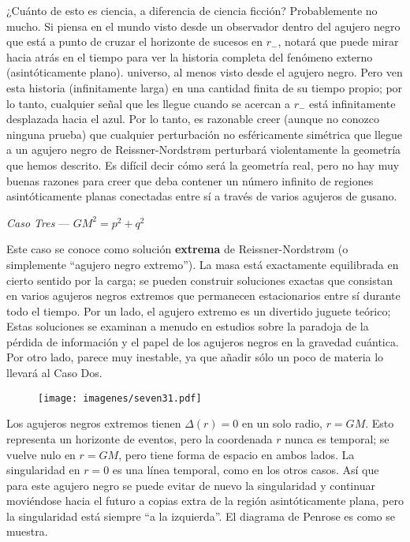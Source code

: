 \documentclass[11pt,b5paper,openany,twoside]{book}
\begin{document}
¿Cuánto de esto es ciencia, a diferencia de ciencia ficción?
Probablemente no mucho.
Si piensa en el mundo visto desde un observador dentro del agujero negro que está a punto de cruzar el horizonte de sucesos en $r_-$, notará que puede mirar hacia atrás en el tiempo para ver la historia completa del fenómeno externo (asintóticamente plano). universo, al menos visto desde el agujero negro.
Pero ven esta historia (infinitamente larga) en una cantidad finita de su tiempo propio; por lo tanto, cualquier señal que les llegue cuando se acercan a $r_-$ está infinitamente desplazada hacia el azul.
Por lo tanto, es razonable creer (aunque no conozco ninguna prueba) que cualquier perturbación no esféricamente simétrica que llegue a un agujero negro de Reissner-Nordstr{\o}m perturbará violentamente la geometría que hemos descrito.
Es difícil decir cómo será la geometría real, pero no hay muy buenas razones para creer que deba contener un número infinito de regiones asintóticamente planas conectadas entre sí a través de varios agujeros de gusano.

\noindent
{\it Caso Tres} --- $GM^2=p^2+q^2$

Este caso se conoce como solución {\bf extrema} de Reissner-Nordstr{\o}m (o simplemente ``agujero negro extremo'').
La masa está exactamente equilibrada en cierto sentido por la carga; se pueden construir soluciones exactas que consistan en varios agujeros negros extremos que permanecen estacionarios entre sí durante todo el tiempo.
Por un lado, el agujero extremo es un divertido juguete teórico; Estas soluciones se examinan a menudo en estudios sobre la paradoja de la pérdida de información y el papel de los agujeros negros en la gravedad cuántica.
Por otro lado, parece muy inestable, ya que añadir sólo un poco de materia lo llevará al Caso Dos.

\begin{figure}[ht]
\centering
\texttt{[image: imagenes/seven31.pdf]}
\end{figure}

Los agujeros negros extremos tienen $\Delta(r)=0$ en un solo radio, $r=GM$.
Esto representa un horizonte de eventos, pero la coordenada $r$ nunca es temporal; se vuelve nulo en $r=GM$, pero tiene forma de espacio en ambos lados.
La singularidad en $r=0$ es una línea temporal, como en los otros casos.
Así que para este agujero negro se puede evitar de nuevo la singularidad y continuar moviéndose hacia el futuro a copias extra de la región asintóticamente plana, pero la singularidad está siempre ``a la izquierda''. El diagrama de Penrose es como se muestra.
\end{document}
